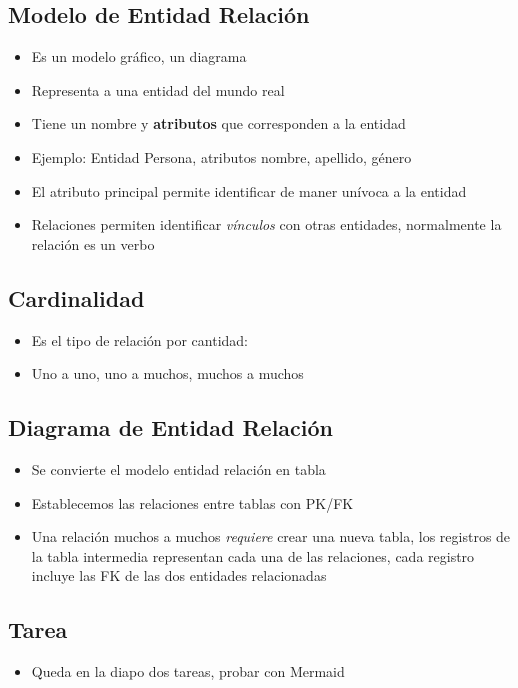 \subsection{Modelo de Entidad Relación}
\begin{itemize}
    \item Es un modelo gráfico, un diagrama
    \item Representa a una entidad del mundo real 
    \item Tiene un nombre y \textbf{atributos} que corresponden a la entidad 
    \item Ejemplo: Entidad Persona, atributos nombre, apellido, género 
    \item El atributo principal permite identificar de maner unívoca a la entidad 
    \item Relaciones permiten identificar \textit{vínculos} con otras entidades,
    normalmente la relación es un verbo 
\end{itemize}

\subsection{Cardinalidad}
\begin{itemize}
    \item Es el tipo de relación por cantidad:
    \item Uno a uno, uno a muchos, muchos a muchos 
\end{itemize}

\subsection{Diagrama de Entidad Relación}
\begin{itemize}
    \item Se convierte el modelo entidad relación en tabla 
    \item Establecemos las relaciones entre tablas con PK/FK 
    \item Una relación muchos a muchos \textit{requiere} crear una nueva tabla,
    los registros de la tabla intermedia representan cada una de las relaciones,
    cada registro incluye las FK de las dos entidades relacionadas
\end{itemize}

\subsection{Tarea}
\begin{itemize}
    \item Queda en la diapo dos tareas, probar con Mermaid
\end{itemize}